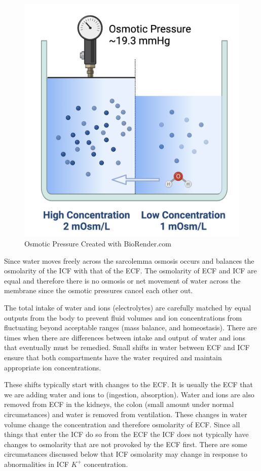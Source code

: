 \begin{figure}[!h]
    \centering
    \includegraphics[width=1\linewidth]{./figure/osmotic_pressure.png}
    \caption{Osmotic Pressure \footnotesize{Created with BioRender.com}}
    \label{fig:osmotic_pressure}
\end{figure}

Since water moves freely across the sarcolemma osmosis occurs and balances the osmolarity of the ICF with that of the ECF. The osmolarity of ECF and ICF are equal and therefore there is no osmosis or net movement of water across the membrane since the osmotic pressures cancel each other out.

The total intake of water and ions (electrolytes) are carefully matched by equal outputs from the body to prevent fluid volumes and ion concentrations from fluctuating beyond acceptable ranges (mass balance, and homeostasis). There are times when there are differences between intake and output of water and ions that eventually must be remedied. Small shifts in water between ECF and ICF ensure that both compartments have the water required and maintain appropriate ion concentrations.

These shifts typically start with changes to the ECF. It is usually the ECF that we are adding water and ions to (ingestion, absorption). Water and ions are also removed from ECF in the kidneys, the colon (small amount under normal circumstances) and water is removed from ventilation.  These changes in water volume change the concentration and therefore osmolarity of ECF. Since all things that enter the ICF do so from the ECF the ICF does not typically have changes to osmolarity that are not provoked by the ECF first. There are some circumstances discussed below that ICF osmolarity may change in response to abnormalities in ICF $K^+$ concentration. 

